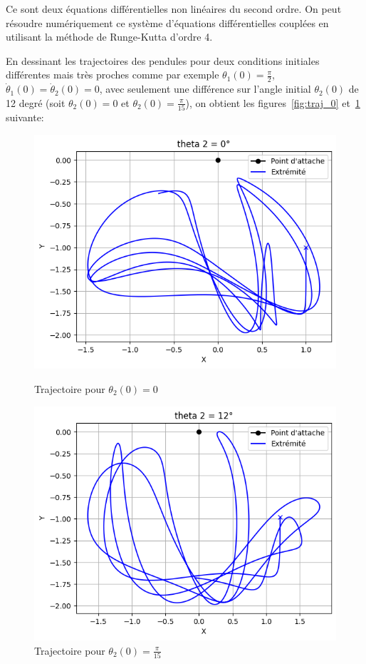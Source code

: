 Ce sont deux équations différentielles non linéaires du second ordre. 
On peut résoudre numériquement ce système d'équations différentielles couplées en utilisant la méthode de Runge-Kutta d'ordre 4.

\bigskip

En dessinant les trajectoires des pendules pour deux conditions initiales différentes mais très proches comme par exemple 
$ \theta_1(0) = \frac{\pi}{2} $, $ \dot \theta_1(0) = \dot \theta_2(0) = 0 $, avec seulement une différence sur l'angle initial $ \theta_2(0) $ de 12 degré (soit $ \theta_2(0) = 0 $ et $ \theta_2(0) = \frac{\pi}{15} $),
on obtient les figures~\ref{fig:traj_0} et~\ref{fig:traj_12} suivante:

\begin{figure} [htbp!]
  \begin{minipage}[c]{0.5\textwidth}
	\centering
	\includegraphics[width=\textwidth]{res/traj_0.png}
	\caption{Trajectoire pour $ \theta_{2}(0) = 0 $}
	  \label{fig:traj_0}
  \end{minipage}\hfill
  \begin{minipage}[c]{0.5\textwidth}
	\centering
	\includegraphics[width=\textwidth]{res/traj_12.png}
	\caption{Trajectoire pour $ \theta_{2}(0) = \frac{\pi}{15} $}
	  \label{fig:traj_12}
  \end{minipage}
\end{figure}

